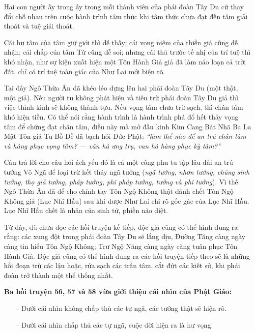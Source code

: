 Hai con người ấy trong ấy trong mỗi thành viên của phái đoàn Tây Du cứ thay đổi chỗ nhau trên cuộc hành trình tâm thức khi tâm thức chưa đạt đến tâm giải thoát và tuệ giải thoát.

Cái hư tâm của tâm giữ giới thì dễ thấy; cái vọng niệm của thiền giả cũng dễ nhận; cái chấp của tâm Từ cũng dễ soi; nhưng cái thủ trước tế nhị của trí tuệ thì khó nhận, như sự kiện xuất hiện một Tôn Hành Giả giả đã làm náo loạn cả trời đất, chỉ có trí tuệ toàn giác của Như Lai mới biện rõ.

Tại đây Ngô Thừa Ân đã khéo léo dựng lên hai phái đoàn Tây Du (một thật, một giả). Nếu người tu không phát hiện và tiêu trừ phái đoàn Tây Du giả thì việc thỉnh kinh sẽ không thành tựu. Nếu vọng tâm chưa trừ sạch, thì chân tâm khó hiện tiền. Có thể nói rằng hành trình là hành trình phá đổ hết thảy vọng tâm để chứng đạt chân tâm, điều này mà mở đầu kinh Kim Cang Bát Nhã Ba La Mật Tôn giả Tu Bồ Đề đã bạch hỏi Đức Phật: \emph{``làm thế nào để an trú chân tâm và hàng phục vọng tâm? — vân hà ưng trụ, van hà hàng phục kỳ tâm?''}

Câu trả lời cho câu hỏi ách yếu đó là cả một công phu tu tập lâu dài an trú tưởng Vô Ngã để loại trừ hết thảy ngã tưởng (\emph{ngã tưởng, nhơn tưởng, chúng sinh tưởng, thọ giả tưởng, pháp tưởng, phi pháp tưởng, tưởng và phi tưởng}). Vì thế Ngô Thừa Ân đã để cho chính tay Tôn Ngộ Không thật đánh chết Tôn Ngộ Không giả (Lục Nhĩ Hầu) sau khi được Như Lai chỉ rõ gốc gác của Lục Nhĩ Hầu. Lục Nhĩ Hầu chết là nhân của sinh tử, phiền não diệt.

Từ đây, dù chưa đọc các hồi truyện kế tiếp, độc giả cũng có thể hình dung ra rằng: các xung đột trong phái đoàn Tây Du sẽ lắng dịu, Đường Tăng càng ngày càng tin hiểu Tôn Ngộ Không; Trư Ngộ Năng càng ngày càng tuân phục Tôn Hành Giả. Độc giả cũng có thể hình dung ra các hồi truyện tiếp theo sẽ là những hồi đoạn trừ các lậu hoặc, rửa sạch các trần tâm, cắt đứt các kiết sử, khi phái đoàn trở thành một thể thống nhất.

{\bf Ba hồi truyện 56, 57 và 58 vừa giới thiệu cái nhìn của Phật Giáo:}

\begin{itemize}
    \item[–] Dưới cái nhìn không chấp thủ các tự ngã, các tướng thật sẽ hiện rõ.

    \item[–] Dưới cái nhìn chấp thủ các tự ngã, cuộc đời hiện ra là hư vọng.
\end{itemize}

